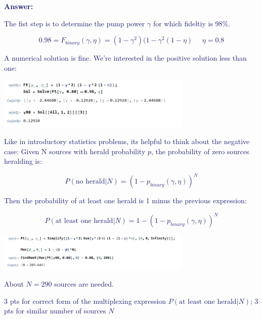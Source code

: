 \documentclass[11pt]{caltech_thesis} %
\begin{document}
\begin{enumerate}
  \textcolor{midnightblue}{ \textbf{Answer:} }

  \textcolor{midnightblue}{The fist step is to determine the pump power $\gamma$ for which fideltiy is 98\%. }

  \textcolor{midnightblue}{

  $$0.98 = F_{binary}(\gamma, \eta) = (1 - \gamma^2)(1 - \gamma^2(1 - \eta)\,\,\,\,\,\,\,\, \eta = 0.8$$

  }

  \textcolor{midnightblue}{ A numerical solution is fine. We're interested in the positive solution less than one:}

  \textcolor{midnightblue}{\includegraphics[width=0.7\textwidth,height=\textheight]{./chapter_07/figs/Ftsolve.PNG}}

  \textcolor{midnightblue}{Like in introductory statistics problems, its helpful to think about the negative case: Given N sources with herald probability $p$, the probability of zero sources heralding is:}

  \textcolor{midnightblue}{

  $$P(\text{no herald}|N) = (1 - p_{binary}\left(\gamma, \eta\right))^N$$

  }

  \textcolor{midnightblue}{Then the probability of at least one herald is 1 minus the previous expression:}

  \textcolor{midnightblue}{

  $$P(\text{at least one herald}|N) = 1 - (1 - p_{binary}\left(\gamma, \eta\right))^N$$

  }

  \textcolor{midnightblue}{\includegraphics[width=0.7\textwidth,height=\textheight]{./chapter_07/figs/mux_binary.PNG}}

  \textcolor{midnightblue}{About $\boxed{N = 290}$ sources are needed.}

  \textcolor{midnightblue}{3 pts for correct form of the multiplexing expression
  $P(\text{at least one herald}|N)$; 3 pts for similar number of sources $N$}
\end{enumerate}
\end{document}
